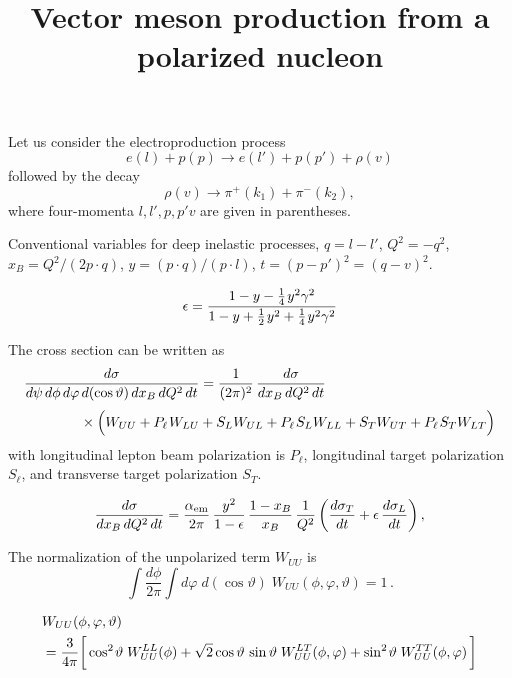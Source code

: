 \documentclass[12pt]{article}
\title{Vector meson production from a polarized nucleon}
\newcommand{\ms}{\mskip 1.5mu}
\newcommand{\bs}{\mskip -1.5mu}
\newcommand{\0}{{\mskip 2.5mu} 0 {\mskip 2.5mu}}
\begin{document}
Let us consider the electroproduction process
\begin{equation}
  \label{production}
e(l) + p(p) \to e(l') + p(p') + \rho(v) 
\end{equation}
followed by the decay
\begin{equation}
  \label{decay}
\rho(v) \to \pi^+(k_1) + \pi^-(k_2) ,
\end{equation}
where four-momenta $l, l', p, p' v$ are given in parentheses.  


Conventional variables for deep
inelastic processes, $q=l-l'$, $Q^2= -q^2$, $x_B= Q^2 /(2 p\cdot q)$,
$y=(p\cdot q) /(p\cdot l)$, $t=(p-p')^2=(q-v)^2$.  

\begin{equation}
  \label{eps-def}
\epsilon
  = \frac{1 - y - \frac{1}{4}\ms y^2 \gamma^2}{
          1 - y + \frac{1}{2}\ms y^2 + \frac{1}{4}\ms y^2 \gamma^2}
\end{equation}


The cross section can be written as
\begin{align}
  \label{X-sect}
& \frac{d\sigma}{d\psi\, d\phi\, d\varphi\, d(\cos\vartheta)\,
                 dx_B\, dQ^2\, dt}
 = \frac{1}{(2\pi)^2}\, \frac{d\sigma}{dx_B\, dQ^2\, dt}\,
\nonumber \\[0.3em]
&\qquad\qquad \times
   \Bigl( W_{UU} + P_\ell\ms W_{LU} 
        + S_L W_{UL} + P_\ell\ms S_L W_{LL}
        + S_T W_{UT} + P_\ell\ms S_T W_{LT} \Bigr)
\end{align}
with longitudinal lepton beam polarization is $P_\ell$, longitudinal target polarization $S_\ell$, and transverse target polarization $S_T$.

\begin{equation}
\frac{d\sigma}{dx_B\, dQ^2\, dt} =
\frac{\alpha_{\rm em}}{2\pi}\, \frac{y^2}{1-\epsilon}\,
   \frac{1-x_B}{x_B}\, \frac{1}{Q^2}\,
   \biggl( \frac{d\sigma_T}{dt} 
         + \epsilon\, \frac{d\sigma_L}{dt} \biggr) \,,
\end{equation}

 The normalization of the unpolarized term $W_{UU}$ is
\begin{equation}
  \label{W-norm}
\int \frac{d\phi}{2\pi}
\int d\varphi\; d(\cos\vartheta)\; W_{UU}(\phi,\varphi,\vartheta)
  = 1 \,.
\end{equation}
%

\begin{align}
  \label{W-dec}
& W_{UU}(\phi,\varphi,\vartheta) 
\nonumber \\
& = \frac{3}{4\pi} \biggl[\,
     \cos^2\bs\vartheta\; W_{UU}^{LL}(\phi)
   + \sqrt{2} \cos\vartheta\, \sin\vartheta\;
                          W_{UU}^{LT}(\phi,\varphi)
   + \sin^2\bs\vartheta\; W_{UU}^{TT}(\phi,\varphi)
   \,\biggr]
\end{align}
\end{document}
